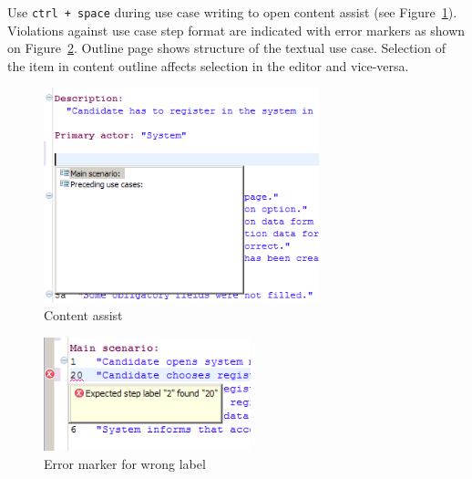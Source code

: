 Use \verb|ctrl + space| during use case writing to open content assist (see Figure~\ref{fig:contentAssist}). Violations against use case step format are indicated with error markers as shown on Figure~\ref{fig:wrongLabel}.
Outline page shows structure of the textual use case. Selection of the item in content outline affects selection in the editor and vice-versa.

\begin{figure}[ht]
  \centering
  \includegraphics[width=8cm]{images/txtuc-editor/contentAssist}
  \caption{Content assist}
  \label{fig:contentAssist}
\end{figure}

\begin{figure}[ht]
  \includegraphics[width=6cm]{images/txtuc-editor/wrongLabel}
  \caption{Error marker for wrong label}
  \label{fig:wrongLabel}
\end{figure}




